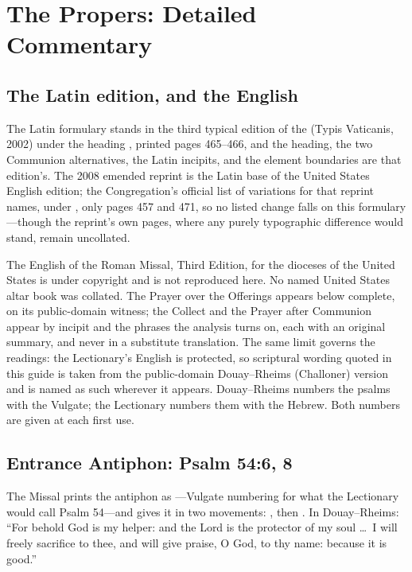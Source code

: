 \section*{The Propers: Detailed Commentary}

\subsection*{The Latin edition, and the English}

The Latin formulary stands in the third typical edition of the
 (Typis Vaticanis, 2002) under the heading
, printed pages 465--466, and the heading,
the two Communion alternatives, the Latin incipits, and the element boundaries
are that edition's. The
2008 emended reprint is the Latin base of the United States English edition;
the Congregation's official list of variations for that reprint names, under
, only pages 457 and 471, so no listed change falls
on this formulary---though the reprint's own pages, where any purely
typographic difference would stand, remain uncollated.

The English of the Roman Missal, Third Edition, for the dioceses of the United
States is under copyright and is not reproduced here. No named United States
altar book was collated. The Prayer over the Offerings appears below complete,
on its public-domain witness; the Collect and the Prayer after Communion appear
by incipit and the phrases the analysis turns on, each with an original
summary, and never in a substitute translation. The same limit governs the readings:
the Lectionary's English is protected, so scriptural wording quoted in this
guide is taken from the public-domain Douay--Rheims (Challoner) version and is
named as such wherever it appears. Douay--Rheims numbers the psalms with the
Vulgate; the Lectionary numbers them with the Hebrew. Both numbers are given
at each first use.

\subsection*{Entrance Antiphon: Psalm 54:6, 8}

The Missal prints the antiphon as ---Vulgate numbering for
what the Lectionary would call Psalm 54---and gives it in two movements:
, then
. In Douay--Rheims: ``For behold God is my helper: and the
Lord is the protector of my soul \dots\ I will freely sacrifice to thee, and
will give praise, O God, to thy name: because it is good.''


